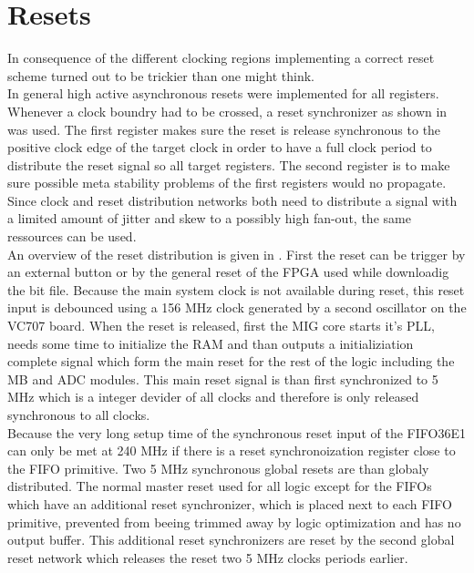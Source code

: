\section{Resets}
\label{sec:fpga_reset}

In consequence of the different clocking regions implementing a correct
reset scheme turned out to be trickier than one might think. \\

In general high active asynchronous resets were implemented for all
registers. Whenever a clock boundry had to be crossed, a reset synchronizer
as shown in  was used. The first register
makes sure the reset is release synchronous to the positive clock edge
of the target clock in order to have a full clock period to distribute
the reset signal so all target registers. The second register is
to make sure possible meta stability problems of the first registers would
no propagate. Since clock and reset distribution networks both need to
distribute a signal with a limited amount of jitter and skew to a possibly
high fan-out, the same ressources can be used.  \\

An overview of the reset distribution is given in
. First the reset can be trigger
by an external button or by the general reset of the \gls{FPGA}
used while downloadig the bit file. Because the main system clock is
not available during reset, this reset input is debounced using a
156 MHz clock generated by a second oscillator on the VC707 board.
When the reset is released, first the \gls{MIG} core starts
it's \gls{PLL}, needs some time to initialize the \gls{RAM} and than
outputs a initializiation complete signal which form the main reset
for the rest of the logic including the \gls{MB} and \gls{ADC} modules.
This main reset signal is than first synchronized to 5 MHz which is a
integer devider of all clocks and therefore is only released synchronous
to all clocks. \\

Because the very long setup time of the synchronous reset input of the FIFO36E1
can only be met at 240 MHz if there is a reset synchronoization register
close to the FIFO primitive. Two 5 MHz synchronous global resets are than 
globaly distributed. The normal master reset used for all logic except
for the FIFOs which have an additional reset synchronizer, which is
placed next to each FIFO primitive, prevented from beeing trimmed
away by logic optimization and has no output buffer.
This additional reset synchronizers are reset by the second global reset network
which releases the reset two 5 MHz clocks periods earlier.  \\

